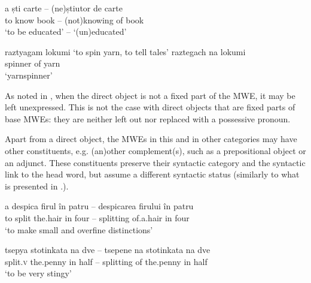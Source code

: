 \documentclass[output=paper]{langsci/langscibook}
\begin{document}
\begin{exe}
\ex \label{ex:8:37}
\settowidth{}
\gll a ști carte – (ne)știutor de carte \\
to know book  – (not)knowing of book \\ 
\glt ‘to be educated’ – ‘(un)educated’
\end{exe}

\begin{exe}
\ex \label{ex:8:38}
\begin{xlist}
\ex \label{ex:8:38a}
\settowidth{}
raztyagam lokumi  
‘to spin yarn, to tell tales’
\ex \label{ex:8:38b}
\settowidth{}
\gll raztegach na lokumi\\
spinner of yarn \\
\glt ‘yarnspinner’
\end{xlist}
\end{exe}


As noted in , when the direct object is not a fixed part of the MWE,
it may be left unexpressed. This is not the case with direct objects
that are fixed parts of base MWEs: they are neither left out nor
replaced with a possessive pronoun.



Apart from a direct object, the MWEs in this and in other categories may
have other constituents, e.g. (an)other complement(s), such as a
prepositional object or an adjunct. These constituents preserve their
syntactic category and the syntactic link to the head word, but assume
a different syntactic status (similarly to what is presented in .).


\begin{exe}
\ex \label{ex:8:39}
\settowidth{}
\gll a despica firul în patru – despicarea firului în patru\\
to  split  {the.hair} in four –  splitting {of.a.hair} in four \\ 
\glt ‘to make small and overfine distinctions’ 
\end{exe}

\begin{exe}
\ex \label{ex:8:40}
\settowidth{}
\gll tsepya stotinkata na dve – tsepene na stotinkata na dve\\
split.\textsc{v} {the.penny} in half – splitting of {the.penny} in half\\ 
\glt ‘to be very stingy’
\end{exe}
\end{document}
